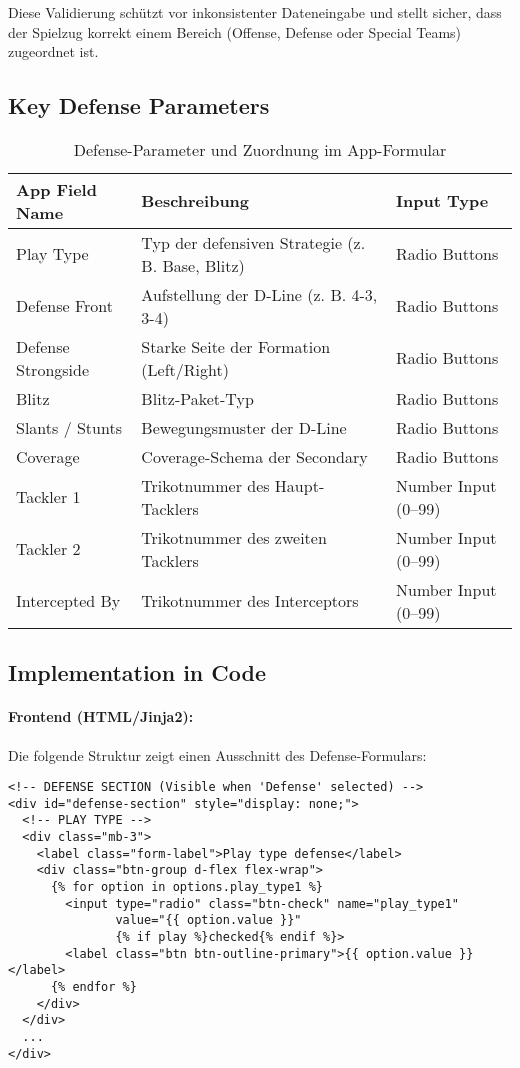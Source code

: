 Diese Validierung schützt vor inkonsistenter Dateneingabe und stellt sicher, dass der Spielzug korrekt einem Bereich (Offense, Defense oder Special Teams) zugeordnet ist.

\subsection{Key Defense Parameters}

\begin{table}[H]
\centering
\begin{tabular}{|l|p{6cm}|l|}
\hline
\textbf{App Field Name} & \textbf{Beschreibung} & \textbf{Input Type} \\
\hline
Play Type          & Typ der defensiven Strategie (z. B. Base, Blitz) & Radio Buttons \\
Defense Front      & Aufstellung der D-Line (z. B. 4-3, 3-4) & Radio Buttons \\
Defense Strongside & Starke Seite der Formation (Left/Right) & Radio Buttons \\
Blitz              & Blitz-Paket-Typ & Radio Buttons \\
Slants / Stunts    & Bewegungsmuster der D-Line & Radio Buttons \\
Coverage           & Coverage-Schema der Secondary & Radio Buttons \\
Tackler 1          & Trikotnummer des Haupt-Tacklers & Number Input (0–99) \\
Tackler 2          & Trikotnummer des zweiten Tacklers & Number Input (0–99) \\
Intercepted By     & Trikotnummer des Interceptors & Number Input (0–99) \\
\hline
\end{tabular}
\caption{Defense-Parameter und Zuordnung im App-Formular}
\end{table}


\subsection{Implementation in Code}

\paragraph{Frontend (HTML/Jinja2):} Die folgende Struktur zeigt einen Ausschnitt des Defense-Formulars:

\begin{verbatim}
<!-- DEFENSE SECTION (Visible when 'Defense' selected) -->
<div id="defense-section" style="display: none;">
  <!-- PLAY TYPE -->
  <div class="mb-3">
    <label class="form-label">Play type defense</label>
    <div class="btn-group d-flex flex-wrap">
      {% for option in options.play_type1 %}
        <input type="radio" class="btn-check" name="play_type1"
               value="{{ option.value }}"
               {% if play %}checked{% endif %}>
        <label class="btn btn-outline-primary">{{ option.value }}</label>
      {% endfor %}
    </div>
  </div>
  ...
</div>
\end{verbatim}


